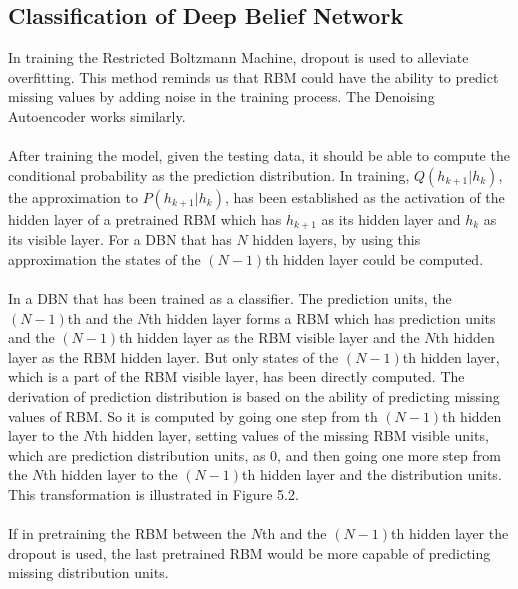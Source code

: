 \documentclass[12pt]{article}
\begin{document}
\subsection{Classification of Deep Belief Network}
In training the Restricted Boltzmann Machine, dropout is used to alleviate overfitting. This method reminds us that RBM could have the ability to predict missing values by adding noise in the training process. The Denoising Autoencoder works similarly.\\
\\
After training the model, given the testing data, it should be able to compute the conditional probability as the prediction distribution. In training, $Q(h_{k+1}|h_k)$, the approximation to $P(h_{k+1}|h_k)$,  has been established as the activation of the hidden layer of a pretrained RBM which has $h_{k+1}$ as its hidden layer and $h_k$ as its visible layer. For a DBN that has $N$ hidden layers, by using this approximation the states of the $(N-1)$th hidden layer could be computed.\\
\\
In a DBN that has been trained as a classifier. The prediction units, the $(N-1)$th and the $N$th hidden layer forms a RBM which has prediction units and the $(N-1)$th hidden layer as the RBM visible layer and the $N$th hidden layer as the RBM hidden layer. But only states of the $(N-1)$th hidden layer, which is a part of the RBM visible layer, has been directly computed. The derivation of prediction distribution is based on the ability of predicting missing values of RBM. So it is computed by going one step from th $(N-1)$th hidden layer to the $N$th hidden layer, setting values of the missing RBM visible units, which are prediction distribution units, as 0, and then going one more step from the $N$th hidden layer to the $(N-1)$th hidden layer and the distribution units. This transformation is illustrated in Figure 5.2.\\
\\
If in pretraining the RBM between the $N$th and the $(N-1)$th hidden layer the dropout is used, the last pretrained RBM would be more capable of predicting missing distribution units.
\end{document}
